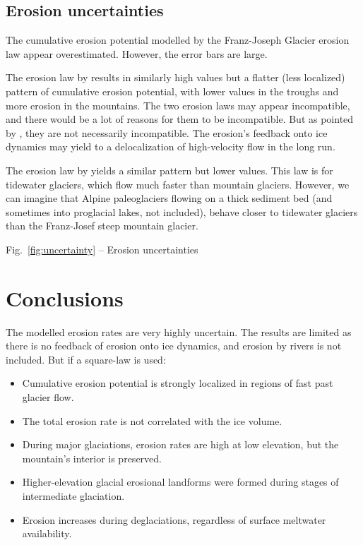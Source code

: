 \documentclass[utf8]{article}
\begin{document}
\subsection{Erosion uncertainties}

    The cumulative erosion potential modelled by the Franz-Joseph Glacier
    erosion law \citep{Herman.etal.2015} appear overestimated. However, the
    error bars are large.

    The erosion law by \citet{Cook.etal.2020} results in similarly high values
    but a flatter (less localized) pattern of cumulative erosion potential,
    with lower values in the troughs and more erosion in the mountains. The two
    erosion laws may appear incompatible, and there would be a lot of reasons
    for them to be incompatible. But as pointed by \citet{Cook.etal.2020}, they
    are not necessarily incompatible. The erosion's feedback onto ice dynamics
    may yield to a delocalization of high-velocity flow in the long run.

    The erosion law by \citet{Koppes.etal.2015} yields a similar pattern but
    lower values. This law is for tidewater glaciers, which flow much faster
    than mountain glaciers. However, we can imagine that Alpine paleoglaciers
    flowing on a thick sediment bed (and sometimes into proglacial lakes, not
    included), behave closer to tidewater glaciers than the Franz-Josef steep
    mountain glacier.

    Fig.~\ref{fig:uncertainty} -- Erosion uncertainties

\section{Conclusions}

    The modelled erosion rates are very highly uncertain. The results are
    limited as there is no feedback of erosion onto ice dynamics, and
    erosion by rivers is not included. But if a square-law is used:
    \begin{itemize}
      \item Cumulative erosion potential is strongly localized in regions
        of fast past glacier flow.
      \item The total erosion rate is not correlated with the ice volume.
      \item During major glaciations, erosion rates are high at low elevation,
        but the mountain's interior is preserved.
      \item Higher-elevation glacial erosional landforms were formed during
        stages of intermediate glaciation.
      \item Erosion increases during deglaciations, regardless of surface
        meltwater availability.
    \end{itemize}
\end{document}
